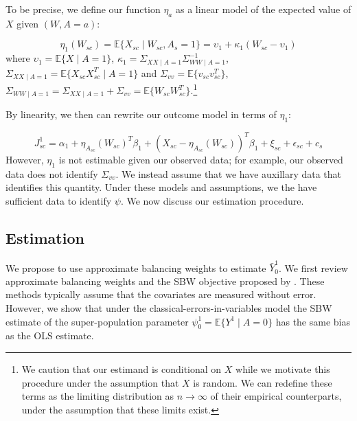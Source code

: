 \documentclass[aoas]{imsart}
\theoremstyle{plain}
\theoremstyle{remark}
\begin{document}
To be precise, we define our function $\eta_a$ as a linear model of the expected value of $X$ given $(W, A = a)$: 

\begin{equation}\label{eqn:regcal}
\eta_1(W_{sc}) = \mathbb{E}\{X_{sc} \mid W_{sc}, A_{s} = 1\} = \upsilon_1 + \kappa_1 (W_{sc} - \upsilon_1)
\end{equation}
%
where $\upsilon_1 = \mathbb{E}\{X \mid A = 1\}$, $\kappa_1 = \Sigma_{XX \mid A = 1}\Sigma_{WW \mid A = 1}^{-1}$, $\Sigma_{XX \mid A = 1} = \mathbb{E}\{X_{sc}X_{sc}^T \mid A = 1\}$ and $\Sigma_{vv} = \mathbb{E}\{v_{sc}v_{sc}^T\}$, $\Sigma_{WW \mid A = 1} = \Sigma_{XX \mid A = 1} + \Sigma_{vv} = \mathbb{E}\{W_{sc}W_{sc}^T\}$.\footnote{We caution that our estimand is conditional on $X$ while we motivate this procedure under the assumption that $X$ is random. We can redefine these terms as the limiting distribution as $n \to \infty$ of their empirical counterparts, under the assumption that these limits exist.}

By linearity, we then can rewrite our outcome model in terms of $\eta_1$:

\begin{equation}
    J_{sc}^1 = \alpha_1 + \eta_{A_{sc}}(W_{sc})^T\beta_1 + (X_{sc} - \eta_{A_{sc}}(W_{sc}))^T\beta_1 + \xi_{sc} + \epsilon_{sc} + c_s 
\end{equation}
%
However, $\eta_1$ is not estimable given our observed data; for example, our observed data does not identify $\Sigma_{vv}$. We instead assume that we have auxillary data that identifies this quantity. Under these models and assumptions, we the have sufficient data to identify $\psi$. We now discuss our estimation procedure.

\subsection{Estimation}

We propose to use approximate balancing weights to estimate $\bar{Y}_0^1$. We first review approximate balancing weights and the SBW objective proposed by \cite{zubizarreta2015stable}. These methods typically assume that the covariates are measured without error. However, we show that under the classical-errors-in-variables model the SBW estimate of the super-population parameter $\psi_0^1 = \mathbb{E}\{Y^1 \mid A = 0\}$ has the same bias as the OLS estimate. 
\end{document}
